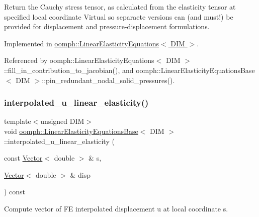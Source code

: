 Return the Cauchy stress tensor, as calculated from the elasticity tensor at specified local coordinate Virtual so separaete versions can (and must!) be provided for displacement and pressure-\/displacement formulations. 



Implemented in \hyperlink{classoomph_1_1LinearElasticityEquations_a9d3ccf59b001a53e53e74a1ae429d6b7}{oomph\+::\+Linear\+Elasticity\+Equations$<$ D\+I\+M $>$}.



Referenced by oomph\+::\+Linear\+Elasticity\+Equations$<$ D\+I\+M $>$\+::fill\+\_\+in\+\_\+contribution\+\_\+to\+\_\+jacobian(), and oomph\+::\+Linear\+Elasticity\+Equations\+Base$<$ D\+I\+M $>$\+::pin\+\_\+redundant\+\_\+nodal\+\_\+solid\+\_\+pressures().

\mbox{\label{classoomph_1_1LinearElasticityEquationsBase_aa3c8cbe3665235f44a8bc497d593f0da}} 
\subsubsection{\texorpdfstring{interpolated\+\_\+u\+\_\+linear\+\_\+elasticity()}{interpolated\_u\_linear\_elasticity()}\hspace{0.1cm}{\footnotesize\ttfamily [1/2]}}
{\footnotesize\ttfamily template$<$unsigned D\+IM$>$ \\
void \hyperlink{classoomph_1_1LinearElasticityEquationsBase}{oomph\+::\+Linear\+Elasticity\+Equations\+Base}$<$ D\+IM $>$\+::interpolated\+\_\+u\+\_\+linear\+\_\+elasticity (\begin{DoxyParamCaption}\item[{const \hyperlink{classoomph_1_1Vector}{Vector}$<$ double $>$ \&}]{s,  }\item[{\hyperlink{classoomph_1_1Vector}{Vector}$<$ double $>$ \&}]{disp }\end{DoxyParamCaption}) const\hspace{0.3cm}{\ttfamily [inline]}}



Compute vector of FE interpolated displacement u at local coordinate s. 



